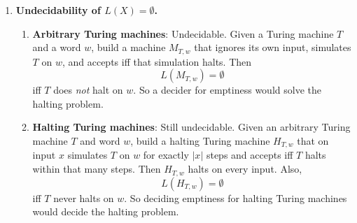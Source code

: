 \begin{enumerate}[{12.}1. ]
\begin{enumerate}
Encoding:
- Terminals: $a \mapsto \texttt{00}$, $b \mapsto \texttt{01}$.
- Nonterminal $N_i \mapsto \texttt{1}^i\texttt{0}$ (unary encoding with terminator).
- Productions: $\alpha\to\beta$ encoded as $\overline{\alpha}\texttt{\#\#}\overline{\beta}$ where $\overline{x}$ is the encoding of $x$ symbol by symbol.
- Grammar: list of productions separated by $\texttt{\#\#\#}$, preceded by the start symbol encoding.

This encoding handles an unbounded number of nonterminals via unary encoding and terminates on any finite grammar.

\item \textbf{Algorithm to decide valid CSG encoding}:
\begin{enumerate}
\item Parse the encoding to extract the alphabet, nonterminal list, start symbol, and productions.
\item Check that: (a) terminal symbols are from $\{a,b\}$; (b) nonterminals are distinct and properly encoded; (c) each production $\alpha\to\beta$ has $|\beta|\geq|\alpha|$ (context-sensitive condition), except possibly $Z\to\lambda$.
\item Verify the syntactic structure of the encoding (valid separators, well-formed strings).
\item The TM accepts valid encodings and rejects invalid ones. Terminates in polynomial time in the encoding length. \qed
\end{enumerate}
\end{enumerate}

\item \textbf{Undecidability of $L(X)=\emptyset$.}

\begin{enumerate}
\item \textbf{Arbitrary Turing machines}: Undecidable. Given a Turing machine
$T$ and a word $w$, build a machine $M_{T,w}$ that ignores its own input,
simulates $T$ on $w$, and accepts iff that simulation halts. Then
\[
L(M_{T,w})=\emptyset
\]
iff $T$ does \emph{not} halt on $w$. So a decider for emptiness would solve the
halting problem.

\item \textbf{Halting Turing machines}: Still undecidable. Given an arbitrary
Turing machine $T$ and word $w$, build a halting Turing machine $H_{T,w}$ that
on input $x$ simulates $T$ on $w$ for exactly $|x|$ steps and accepts iff $T$
halts within that many steps. Then $H_{T,w}$ halts on every input. Also,
\[
L(H_{T,w})=\emptyset
\]
iff $T$ never halts on $w$. So deciding emptiness for halting Turing machines
would decide the halting problem.


\end{enumerate}
\end{enumerate}
